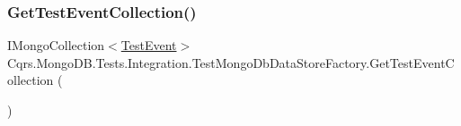 \subsubsection{\texorpdfstring{Get\+Test\+Event\+Collection()}{GetTestEventCollection()}}
{\footnotesize\ttfamily I\+Mongo\+Collection$<$\hyperlink{classCqrs_1_1Azure_1_1ServiceBus_1_1Tests_1_1Unit_1_1TestEvent}{Test\+Event}$>$ Cqrs.\+Mongo\+D\+B.\+Tests.\+Integration.\+Test\+Mongo\+Db\+Data\+Store\+Factory.\+Get\+Test\+Event\+Collection (\begin{DoxyParamCaption}{ }\end{DoxyParamCaption})}

